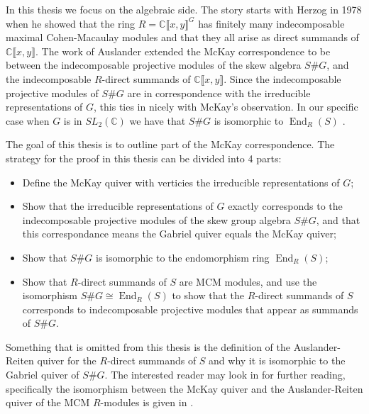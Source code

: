 \documentclass[11pt, a4paper, english]{article}
\theoremstyle{definition}
\newcommand{\C}{\mathbb{C}}
\DeclareMathOperator{\End}{End}
\begin{document}
In this thesis we focus on the algebraic side. The story starts with Herzog in 1978 \cite{Her78} when he showed that the ring $R = \C\llbracket x, y \rrbracket^G$ has finitely many indecomposable maximal Cohen-Macaulay modules and that they all arise as direct summands of $\C\llbracket x, y \rrbracket$. The work of Auslander \cite{Aus86} extended the McKay correspondence to be between the indecomposable projective modules of the skew algebra $S\#G$, and the indecomposable $R$-direct summands of $\C\llbracket x, y \rrbracket$. Since the indecomposable projective modules of $S\#G$ are in correspondence with the irreducible representations of $G$, this ties in nicely with McKay's observation. In our specific case when $G$ is in $SL_2(\C)$ we have that $S\#G$ is isomorphic to $\End_R(S)$ \cite{AG60, Aus62}.

The goal of this thesis is to outline part of the McKay correspondence. The strategy for the proof in this thesis can be divided into 4 parts:
\begin{itemize}
\item Define the McKay quiver with verticies the irreducible representations of $G$;
\item Show that the irreducible representations of $G$ exactly corresponds to the indecomposable projective modules of the skew group algebra $S\#G$, and that this correspondance means the Gabriel quiver equals the McKay quiver;
\item Show that $S\#G$ is isomorphic to the endomorphism ring $\End_R(S)$;
\item Show that $R$-direct summands of $S$ are MCM modules, and use the isomorphism $S\#G \cong \End_R(S)$ to show that the $R$-direct summands of $S$ corresponds to indecomposable projective modules that appear as summands of $S\#G$.
\end{itemize}
Something that is omitted from this thesis is the definition of the Auslander-Reiten quiver for the $R$-direct summands of $S$ and why it is isomorphic to the Gabriel quiver of $S\#G$. The interested reader may look in \cite{LW12} for further reading, specifically the isomorphism between the McKay quiver and the Auslander-Reiten quiver of the MCM $R$-modules is given in \cite[Proposition~13.22]{LW12}.

\clearpage
\end{document}
